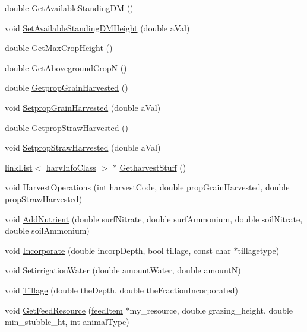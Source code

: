 \begin{DoxyCompactItemize}
double \hyperlink{classecosystinterface_class_af71aa19f5610ccde073c4b498a449e62}{GetAvailableStandingDM} ()
\item 
void \hyperlink{classecosystinterface_class_a9c73e61b3abb64416ef8f40c8bd023a8}{SetAvailableStandingDMHeight} (double aVal)
\item 
double \hyperlink{classecosystinterface_class_ae4efafe35834dd9514bc083c8173826b}{GetMaxCropHeight} ()
\item 
double \hyperlink{classecosystinterface_class_a5e3e01abfca3ef0004505bab44b29231}{GetAbovegroundCropN} ()
\item 
double \hyperlink{classecosystinterface_class_a2aabf0362d79e2b148c4eb49d2139bf3}{GetpropGrainHarvested} ()
\item 
void \hyperlink{classecosystinterface_class_a29967d403abe70ffdac5a3ae1c704278}{SetpropGrainHarvested} (double aVal)
\item 
double \hyperlink{classecosystinterface_class_a124ec17974e3e724b051415f1a21e3e3}{GetpropStrawHarvested} ()
\item 
void \hyperlink{classecosystinterface_class_a78aa1ba30bfeabe5c15674f32081f20e}{SetpropStrawHarvested} (double aVal)
\item 
\hyperlink{classlink_list}{linkList}$<$ \hyperlink{classharv_info_class}{harvInfoClass} $>$ $\ast$ \hyperlink{classecosystinterface_class_a3313299141cabab000f4865bc7ffa20f}{GetharvestStuff} ()
\item 
void \hyperlink{classecosystinterface_class_adeea47518b841a57ed38f1210fe91311}{HarvestOperations} (int harvestCode, double propGrainHarvested, double propStrawHarvested)
\item 
void \hyperlink{classecosystinterface_class_a8eac6b15670e988eb7b23154b2728fa6}{AddNutrient} (double surfNitrate, double surfAmmonium, double soilNitrate, double soilAmmonium)
\item 
void \hyperlink{classecosystinterface_class_a6f6d16c5273187cdb9fd2da5dfc7237f}{Incorporate} (double incorpDepth, bool tillage, const char $\ast$tillagetype)
\item 
void \hyperlink{classecosystinterface_class_ac8d26fd3ac8c4521bb697172b8f23af1}{SetirrigationWater} (double amountWater, double amountN)
\item 
void \hyperlink{classecosystinterface_class_adbbd88e1379ddc5479821491d0bd06ed}{Tillage} (double theDepth, double theFractionIncorporated)
\item 
void \hyperlink{classecosystinterface_class_a45ccc1ec44952040bb88f47974670b37}{GetFeedResource} (\hyperlink{classfeed_item}{feedItem} $\ast$my\_\-resource, double grazing\_\-height, double min\_\-stubble\_\-ht, int animalType)

\end{DoxyCompactItemize}
